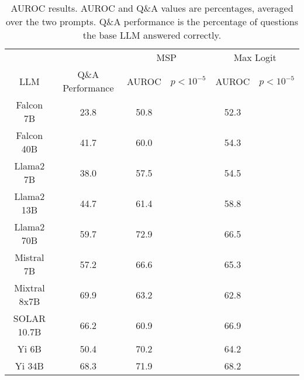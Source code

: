 \begin{table*}
\centering
\begin{tabular}{c|c|c|c|c|c}
& & \multicolumn{2}{c|}{MSP} & \multicolumn{2}{c}{Max Logit} \\ 
LLM & Q\&A Performance & AUROC & $p < 10^{-5}$ & AUROC & $p < 10^{-5}$\\ \hline
Falcon 7B & 23.8 & 50.8 &  & 52.3 & \\
Falcon 40B & 41.7 & 60.0 &  & 54.3 & \\
Llama2 7B & 38.0 & 57.5 &  & 54.5 & \\
Llama2 13B & 44.7 & 61.4 &  & 58.8 & \\
Llama2 70B & 59.7 & 72.9 &  & 66.5 & \\
Mistral 7B & 57.2 & 66.6 &  & 65.3 & \\
Mixtral 8x7B & 69.9 & 63.2 &  & 62.8 & \\
SOLAR 10.7B & 66.2 & 60.9 &  & 66.9 & \\
Yi 6B & 50.4 & 70.2 &  & 64.2 & \\
Yi 34B & 68.3 & 71.9 &  & 68.2 & \\
\hline
\end{tabular}
\caption{AUROC results. AUROC and Q\&A values are percentages, averaged over the two prompts. Q\&A performance is the percentage of questions the base LLM answered correctly.}
\label{tab:auroc}
\end{table*}
